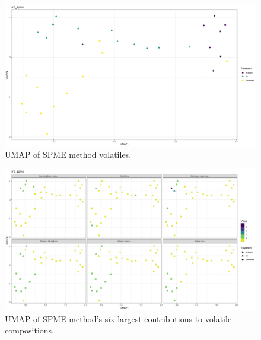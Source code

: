 \documentclass{ufdissertation}[overrideChapters] %
\begin{document}
{\begin{figure}
{\centering \includegraphics[width=1\linewidth]{figure/rrv_volatiles_umap_rrd_spme} 

}

\caption[UMAP of SPME method volatiles]{UMAP of SPME method volatiles.}\label{fig:spme-vocs-umap}
\end{figure}
\begin{figure}

{\centering \includegraphics[width=1\linewidth]{figure/rrv_volatiles_umap_chems_rrd_spme} 

}

\caption[UMAP of SPME method's six largest contributions to volatile compositions]{UMAP of SPME method's six largest contributions to volatile compositions.}\label{fig:spme-vocs-umap-chems}
\end{figure}
\begin{table}


\end{table}}
\end{document}
